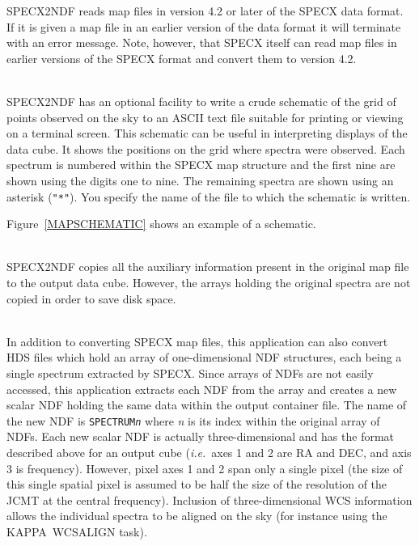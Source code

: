 \documentclass[twoside,11pt]{article}
\newcommand{\latex}[1]{#1}
\newcommand{\html}[1]{}
\newcommand{\xref}[3]{#1}
\newcommand{\KAPPA}{{\footnotesize KAPPA}}
\newcommand{\sstdiytopic}[2]{\goodbreak \item[{\hspace{-0.35em}#1\hspace{-0.35em}:}] \mbox{} \\[1.3ex] #2}
\newcommand{\sstdiytopic}[2]{\\ \item[{#1}:]
      \begin{description}
         #2
      \end{description}
   }
\begin{document}
{{      SPECX2NDF reads map files in version 4.2 or later of the SPECX data 
      format. If it is given a map file in an earlier version of the
      data format it will terminate with an error message.  Note,
      however, that SPECX itself can read map files in earlier versions
      of the SPECX format and convert them to version 4.2.
   }
   \sstdiytopic{
      Schematic of the map grid   \label{SCHEMATICMAP}
   }{
      SPECX2NDF has an optional facility to write a crude schematic of
      the grid of points observed on the sky to an ASCII text file
      suitable for printing or viewing on a terminal screen.  This
      schematic can be useful in interpreting displays of the data cube.
      It shows the positions on the grid where spectra were observed.
      Each spectrum is numbered within the SPECX map structure and the
      first nine are shown using the digits one to nine.  The remaining
      spectra are shown using an asterisk (\texttt{"*"}).  You specify the name
      of the file to which the schematic is written.
      \html{The figure below}
      \latex{Figure~\ref{MAPSCHEMATIC}} shows an example of a schematic.
   }
   \sstdiytopic{
      Auxiliary information
   }{
      SPECX2NDF copies all the auxiliary information present in the
      original map file to the output data cube.  However, the arrays
      holding the original spectra are not copied in order to save
      disk space.
   }
   \sstdiytopic{
      Input and output spectra formats
   }{
      In addition to converting SPECX map files, this application can also
      convert HDS files which hold an array of one-dimensional NDF structures,
      each being a single spectrum extracted by SPECX.  Since arrays of NDFs
      are not easily accessed, this application extracts each NDF from the
      array and creates a new scalar NDF holding the same data within the
      output container file.  The name of the new NDF is \texttt{SPECTRUM\textit{n}} 
      where \textit{n} is its index within the original array of NDFs. 
      Each new scalar NDF is actually three-dimensional and has the format
      described above for an output cube (\textit{i.e.}\ axes 1 and 2 are RA and DEC,
      and axis 3 is frequency).  However, pixel axes 1 and 2 span only a
      single pixel (the size of this single spatial pixel is assumed to be
      half the size of the resolution of the JCMT at the central frequency).
      Inclusion of three-dimensional WCS information allows the individual
      spectra to be aligned on the sky (for instance using the \KAPPA\ 
      \xref{WCSALIGN}{sun95}{WCSALIGN} task). 
   }
}
\clearpage
\end{document}
